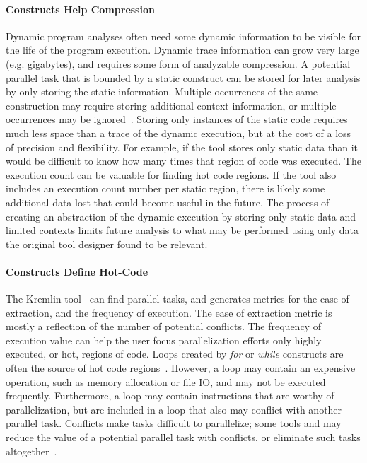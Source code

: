{\noindent\paragraph{Constructs Help Compression}

Dynamic program analyses often need some dynamic information to be visible for the life of the program execution.  Dynamic trace information can grow very large (e.g. gigabytes), and requires some form of analyzable compression.  A potential parallel task that is bounded by a static construct can be stored for later analysis by only storing the static information. Multiple occurrences of the same construction may require storing additional context information, or multiple occurrences may be ignored~\cite{minjang:10:micro, jeon:2011:hotpar, garcia:2011:pldi}.  Storing only instances of the static code requires much less space than a trace of the dynamic execution, but at the cost of a loss of precision and flexibility. For example, if the tool stores only static data than it would be difficult to know how many times that region of code was executed. The execution count can be valuable for finding hot code regions.  If the tool also includes an execution count number per static region, there is likely some additional data lost that could become useful in the future.  The process of creating an abstraction of the dynamic execution by storing only static data and limited contexts limits future analysis to what may be performed using only data the original tool designer found to be relevant.

\noindent\paragraph{Constructs Define Hot-Code}

The Kremlin tool~\cite{garcia:2011:pldi} can find parallel tasks, and generates metrics for the ease of extraction, and the frequency of execution.  The ease of extraction metric is mostly a reflection of the number of potential conflicts.  The frequency of execution value can help the user focus parallelization efforts only highly executed, or hot, regions of code.  Loops created by \textit{for} or \textit{while} constructs are often the source of hot code regions~\cite{bala:2000:pldi}.  However, a loop may contain an expensive operation, such as memory allocation or file IO, and may not be executed frequently.  Furthermore, a loop may contain instructions that are worthy of parallelization, but are included in a loop that also may conflict with another parallel task.  Conflicts make tasks difficult to parallelize; some tools and may reduce the value of a potential parallel task with conflicts, or eliminate such tasks altogether~\cite{garcia:2011:pldi}.

}
